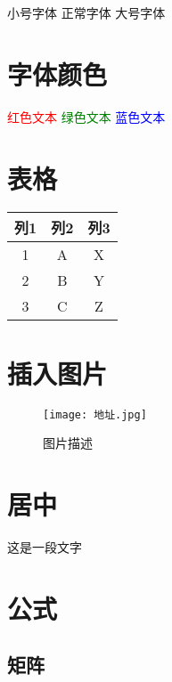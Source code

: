\documentclass[UTF-8]{article}
\begin{document}
\footnotesize{小号字体} 
{正常字体} 
\Large{大号字体}

\section{字体颜色}

\textcolor{red}{红色文本} 
\textcolor{green}{绿色文本} 
\textcolor{blue}{蓝色文本}

\section{表格}

\begin{table}[!htbp]
\centering
\begin{tabular}{*3{c}}
\toprule


  列1 & 列2 & 列3 \\ 


\midrule


  1 & A & X \\ 


  2 & B & Y \\ 


  3 & C & Z \\ 


\bottomrule


\end{tabular}
\end{table}

\section{插入图片}

\begin{figure}
\centering
\texttt{[image: 地址.jpg]}
\caption{图片描述}
\end{figure}

\section{居中}

\begin{centering}
 这是一段文字 
\end{centering} 

\section{公式}

\subsection{矩阵 }
\end{document}
